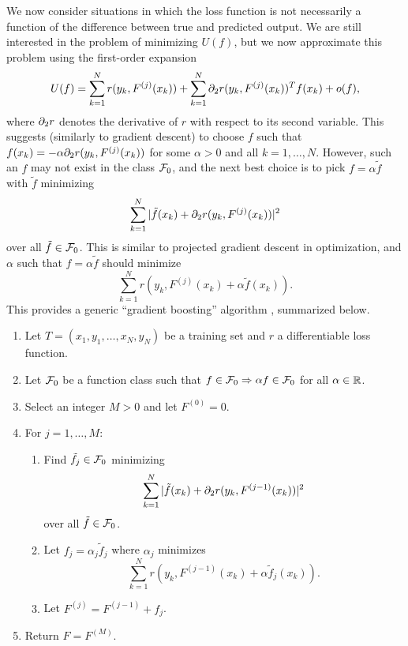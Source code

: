 We now consider situations in which the loss function is not necessarily a function of the difference between true and predicted output. We are still interested in the problem of minimizing $U(f)$, but we now approximate this problem using the first-order expansion
\[
U(f) = \sum_{k=1}^N r(y_k, F^{(j)}(x_k)) + \sum_{k=1}^N \partial_2 r(y_k, F^{(j)}(x_k))^T f(x_k) + o(f) ,
\]
where $\partial_2 r$ denotes the derivative of $r$ with respect to its second variable. This suggests (similarly to gradient descent) to choose $f$ such that $f(x_k) = -\alpha \partial_2 r(y_k, F^{(j)}(x_k))$ for some $\alpha>0$ and all $k=1, \ldots, N$. However, such an $f$ may not exist in the class ${\mathcal F}_0$, and the next best choice is to pick $f = \alpha \tilde f$ with $\tilde f$ minimizing
\[
\sum_{k=1}^N |\tilde f(x_k) + \partial_2 r(y_k, F^{(j)}(x_k))|^2
\] 
over all $\tilde f\in {\mathcal F}_0$. This is similar to projected gradient descent in optimization, and $\alpha$ such that $f = \alpha \tilde f$ should  minimize  
\[
\sum_{k=1}^N r(y_k, F^{(j)}(x_k) + \alpha \tilde f(x_k) ).
\]
This provides a generic ``gradient boosting'' algorithm \citep{friedman2001greedy}, summarized below.
\begin{algorithm}
\label{alg:grad.boost}
\begin{enumerate}[label=$\bullet$]
\item Let $T = (x_1, y_1, \ldots, x_N, y_N)$ be a training set and $r$ a differentiable loss function.
\item Let ${\mathcal F}_0$ be a function class such that $f\in{\mathcal F}_0\Rightarrow \alpha f\in {\mathcal F}_0$ for all $\alpha\in {\mathbb{R}}$.
\item Select an integer $M>0$ and let $F^{(0)} = 0$.
\item For $j=1, \ldots, M$:
\begin{enumerate}[wide=0.5cm]
\item Find  $\tilde f_{j}\in {\mathcal F}_0$ minimizing
\[
\sum_{k=1}^N |\tilde f(x_k) + \partial_2 r(y_k, F^{(j-1)}(x_k))|^2
\] 
over all $\tilde f\in {\mathcal F}_0$.
\item Let $f_j = \alpha_j \tilde{f}_j$ where $\alpha_j$ minimizes
\[
\sum_{k=1}^N r(y_k, F^{(j-1)}(x_k) + \alpha \tilde f_j(x_k) ).
\]
\item Let $F^{(j)} = F^{(j-1)} + f_j$.
\end{enumerate}
\item Return $F = F^{(M)}$.
\end{enumerate}
\end{algorithm}


